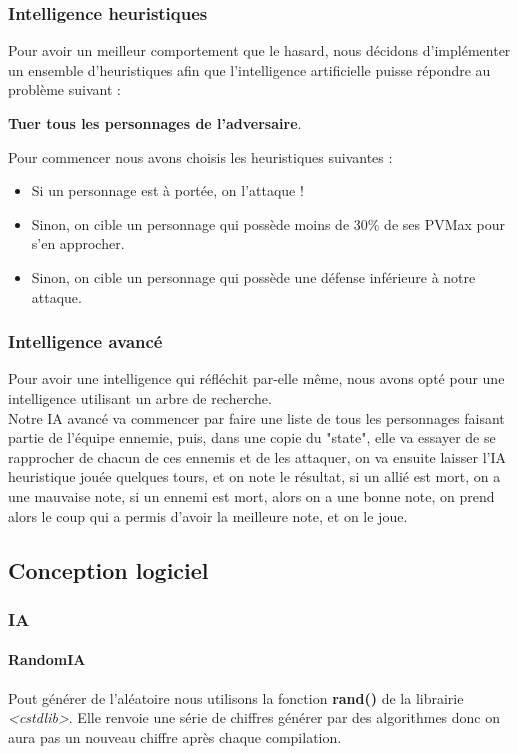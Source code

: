 \documentclass[a4paper,12pt]{article}
\begin{document}
\subsubsection{Intelligence heuristiques}
Pour avoir un meilleur comportement que le hasard, nous décidons d'implémenter un ensemble d'heuristiques afin que l'intelligence artificielle puisse répondre au problème suivant :\\
\begin{center}
\textbf{Tuer tous les personnages de l'adversaire}.
\end{center}
Pour commencer nous avons choisis les heuristiques suivantes :\\
\begin{itemize}
\item Si un personnage est à portée, on l'attaque !
\item Sinon, on cible un personnage qui possède moins de 30\% de ses PVMax pour s'en approcher.
\item Sinon, on cible un personnage qui possède une défense inférieure à notre attaque.
\end{itemize}
\subsubsection{Intelligence avancé}
Pour avoir une intelligence qui réfléchit par-elle même, nous avons opté pour une intelligence utilisant
un arbre de recherche. 
\\ Notre IA avancé va commencer par faire une liste de tous les personnages faisant partie de l'équipe ennemie,
puis, dans une copie du "state", elle va essayer de se rapprocher de chacun de ces ennemis et de les attaquer, 
on va ensuite laisser l'IA heuristique jouée quelques tours, et on note le résultat, si un allié est mort, on a une
mauvaise note, si un ennemi est mort, alors on a une bonne note, on prend alors le coup qui a permis d'avoir
la meilleure note, et on le joue.
\clearpage

\clearpage
\subsection{Conception logiciel}
\subsubsection{IA}
\paragraph{RandomIA}
Pout générer de l'aléatoire nous utilisons la fonction \textbf{rand()} de la librairie \textit{<cstdlib>}. Elle renvoie une série de chiffres générer par des algorithmes donc on aura pas un nouveau chiffre après chaque compilation.
\end{document}
